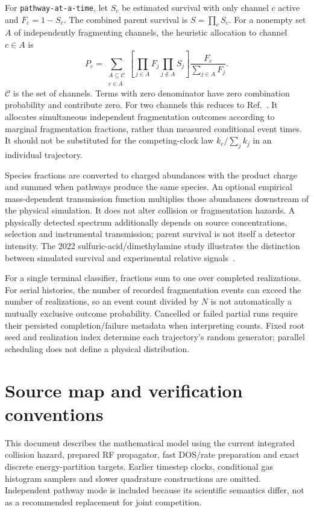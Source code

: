 \documentclass[10pt,a4paper]{article}
\begin{document}
For \texttt{pathway-at-a-time}, let $S_c$ be estimated survival with only
channel $c$ active and $F_c=1-S_c$. The combined parent survival is
$S=\prod_c S_c$. For a nonempty set $A$ of independently fragmenting channels,
the heuristic allocation to channel $c\in A$ is
\begin{equation}
 P_c=\sum_{\substack{A\subseteq\mathcal C\\c\in A}}
 \left[\prod_{j\in A}F_j\prod_{j\notin A}S_j\right]
 \frac{F_c}{\sum_{j\in A}F_j}.
\end{equation}
$\mathcal C$ is the set of channels. Terms with zero denominator have zero
combination probability and contribute zero. For two channels this reduces
to Ref.~\cite{multipath}. It allocates simultaneous independent fragmentation
outcomes according to marginal fragmentation fractions, rather than measured
conditional event times. It should not be substituted for the competing-clock
law $k_c/\sum_j k_j$ in an individual trajectory.

Species fractions are converted to charged abundances with the product charge
and summed when pathways produce the same species. An optional empirical
mass-dependent transmission function multiplies those abundances downstream
of the physical simulation. It does not alter collision or fragmentation
hazards. A physically detected spectrum additionally depends on source
concentrations, selection and instrumental transmission; parent survival is
not itself a detector intensity. The 2022 sulfuric-acid/dimethylamine study
illustrates the distinction between simulated survival and experimental
relative signals~\cite{alfaouri}.

For a single terminal classifier, fractions sum to one over completed
realizations. For serial histories, the number of recorded fragmentation events
can exceed the number of realizations, so an event count divided by $N$ is not
automatically a mutually exclusive outcome probability. Cancelled or failed
partial runs require their persisted completion/failure metadata when interpreting
counts. Fixed root seed and realization index determine each trajectory's
random generator; parallel scheduling does not define a physical distribution.

\clearpage
\section{Source map and verification conventions}\label{app:sources}
This document describes the mathematical model using the current integrated
collision hazard, prepared RF propagator, fast DOS/rate preparation and exact
discrete energy-partition targets. Earlier timestep clocks, conditional gas
histogram samplers and slower quadrature constructions are omitted. Independent
pathway mode is included because its scientific semantics differ, not as a
recommended replacement for joint competition.
\end{document}
